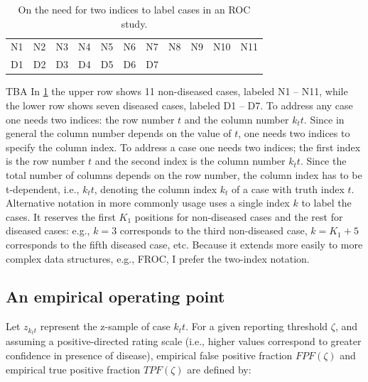 \documentclass[
]{book}
\begin{document}
\begin{table}

\caption{\label{tab:empirical-ROC-2index-notation}On the need for two indices to label cases in an ROC study.}
\centering
\begin{tabular}[t]{l|l|l|l|l|l|l|l|l|l|l}
\hline
 &  &  &  &  &  &  &  &  &  & \\
\hline
N1 & N2 & N3 & N4 & N5 & N6 & N7 & N8 & N9 & N10 & N11\\
\hline
D1 & D2 & D3 & D4 & D5 & D6 & D7 &  &  &  & \\
\hline
\end{tabular}
\end{table}

TBA In \ref{tab:empirical-ROC-2index-notation} the upper row shows 11 non-diseased cases, labeled N1 -- N11, while the lower row shows seven diseased cases, labeled D1 -- D7. To address any case one needs two indices: the row number \(t\) and the column number \(k_tt\). Since in general the column number depends on the value of \(t\), one needs two indices to specify the column index. To address a case one needs two indices; the first index is the row number \(t\) and the second index is the column number \(k_tt\). Since the total number of columns depends on the row number, the column index has to be t-dependent, i.e., \(k_tt\), denoting the column index \(k_t\) of a case with truth index \(t\). Alternative notation in more commonly usage uses a single index \(k\) to label the cases. It reserves the first \(K_1\) positions for non-diseased cases and the rest for diseased cases: e.g., \(k = 3\) corresponds to the third non-diseased case, \(k = K_1+5\) corresponds to the fifth diseased case, etc. Because it extends more easily to more complex data structures, e.g., FROC, I prefer the two-index notation.

\hypertarget{an-empirical-operating-point}{%
\subsection{An empirical operating point}\label{an-empirical-operating-point}}

Let \(z_{k_tt}\) represent the z-sample of case \(k_tt\). For a given reporting threshold \(\zeta\), and assuming a positive-directed rating scale (i.e., higher values correspond to greater confidence in presence of disease), empirical false positive fraction \(FPF(\zeta)\) and empirical true positive fraction \(TPF(\zeta)\) are defined by:
\end{document}
